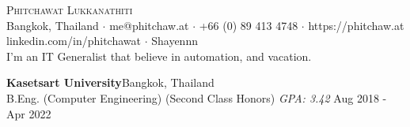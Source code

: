 \vspace*{-40pt}

    

\vspace*{-10pt}
\begin{center}
	{\Huge \scshape {Phitchawat Lukkanathiti}}\\
	Bangkok, Thailand $\cdot$ me@phitchaw.at $\cdot$ +66 (0) 89 413 4748 $\cdot$ https://phitchaw.at \\
        \faLinkedinSquare \vspace{0.4mm} linkedin.com/in/phitchawat $\cdot$ \faGithub \vspace{0.4mm} Shayennn\\
        \vspace{4mm}
        I'm an IT Generalist that believe in automation, and vacation.
\end{center}
\vspace{2mm}

\textbf{Kasetsart University}\hfill Bangkok, Thailand\\
B.Eng. (Computer Engineering) (Second Class Honors) \textit{GPA: 3.42} \hfill Aug 2018 - Apr 2022\\
\vspace{2mm}

\vspace{1mm}

